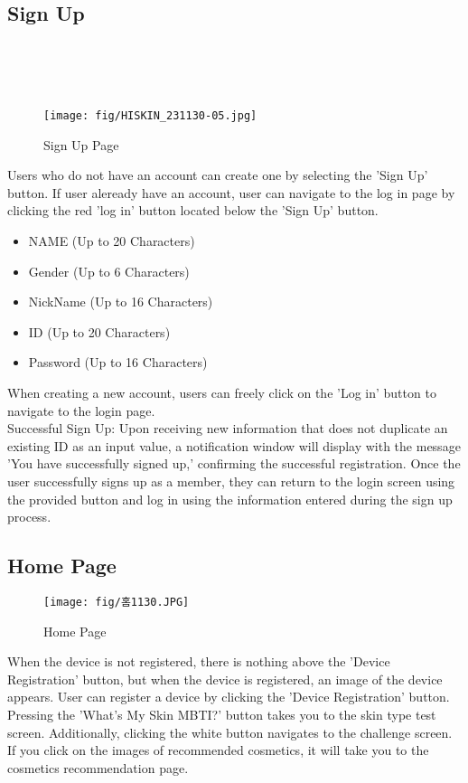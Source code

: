 \documentclass[conference]{IEEEtran}
\begin{document}
\subsection{Sign Up} \\ \\ \\ 
\begin{figure}[h]
    \centering
    \texttt{[image: fig/HISKIN\_231130-05.jpg]}
    \label{fig:Sign Up Page}
    \caption{Sign Up Page} 
    \end{figure}
Users who do not have an account can create one by selecting the 'Sign Up' button. If user aleready have an account, user can navigate to the log in page by clicking the red 'log in' button located below the 'Sign Up' button. 
\begin{itemize}
    \item NAME (Up to 20 Characters)
    \item Gender (Up to 6 Characters)
    \item NickName (Up to 16 Characters)
    \item ID (Up to 20 Characters)
    \item Password (Up to 16 Characters)
\end{itemize}
When creating a new account, users can freely click on the 'Log in' button to navigate to the login page. \\
Successful Sign Up: Upon receiving new information that does not duplicate an existing ID as an input value, a notification window will display with the message 'You have successfully signed up,' confirming the successful registration. Once the user successfully signs up as a member, they can return to the login screen using the provided button and log in using the information entered during the sign up process.\\

\subsection{Home Page} 
\begin{figure}[hbt!]
    \centering
    \texttt{[image: fig/홈1130.JPG]}
    \label{fig:Home Page}
    \caption{Home Page} 
    \end{figure}
When the device is not registered, there is nothing above the 'Device Registration' button, but when the device is registered, an image of the device appears. User can register a device by clicking the 'Device Registration' button. Pressing the 'What's My Skin MBTI?' button takes you to the skin type test screen. Additionally, clicking the white button navigates to the challenge screen. If you click on the images of recommended cosmetics, it will take you to the cosmetics recommendation page.\\ \\ \\ \\ \\ \\ \\ \\
\end{document}
